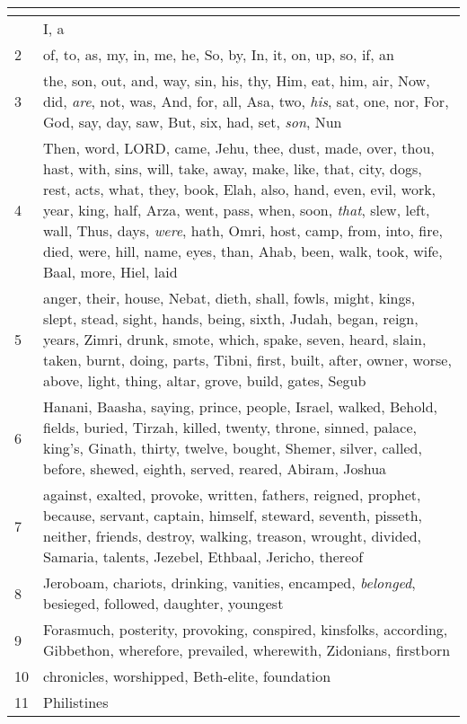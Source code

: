 \begin{center}
\begin{longtable}{l|p{3.75in}}
\hline \multicolumn{2}{c}{{ }} \\ \hline
\endfoot 
1 & I, a\\ \hline 
2 & of, to, as, my, in, me, he, So, by, In, it, on, up, so, if, an\\ \hline 
3 & the, son, out, and, way, sin, his, thy, Him, eat, him, air, Now, did, \emph{are}, not, was, And, for, all, Asa, two, \emph{his}, sat, one, nor, For, God, say, day, saw, But, six, had, set, \emph{son}, Nun\\ \hline 
4 & Then, word, LORD, came, Jehu, thee, dust, made, over, thou, hast, with, sins, will, take, away, make, like, that, city, dogs, rest, acts, what, they, book, Elah, also, hand, even, evil, work, year, king, half, Arza, went, pass, when, soon, \emph{that}, slew, left, wall, Thus, days, \emph{were}, hath, Omri, host, camp, from, into, fire, died, were, hill, name, eyes, than, Ahab, been, walk, took, wife, Baal, more, Hiel, laid\\ \hline 
5 & anger, their, house, Nebat, dieth, shall, fowls, might, kings, slept, stead, sight, hands, being, sixth, Judah, began, reign, years, Zimri, drunk, smote, which, spake, seven, heard, slain, taken, burnt, doing, parts, Tibni, first, built, after, owner, worse, above, light, thing, altar, grove, build, gates, Segub\\ \hline 
6 & Hanani, Baasha, saying, prince, people, Israel, walked, Behold, fields, buried, Tirzah, killed, twenty, throne, sinned, palace, king's, Ginath, thirty, twelve, bought, Shemer, silver, called, before, shewed, eighth, served, reared, Abiram, Joshua\\ \hline 
7 & against, exalted, provoke, written, fathers, reigned, prophet, because, servant, captain, himself, steward, seventh, pisseth, neither, friends, destroy, walking, treason, wrought, divided, Samaria, talents, Jezebel, Ethbaal, Jericho, thereof\\ \hline 
8 & Jeroboam, chariots, drinking, vanities, encamped, \emph{belonged}, besieged, followed, daughter, youngest\\ \hline 
9 & Forasmuch, posterity, provoking, conspired, kinsfolks, according, Gibbethon, wherefore, prevailed, wherewith, Zidonians, firstborn\\ \hline 
10 & chronicles, worshipped, Beth-elite, foundation\\ \hline 
11 & Philistines\\ \hline 
\end{longtable}
\end{center}





